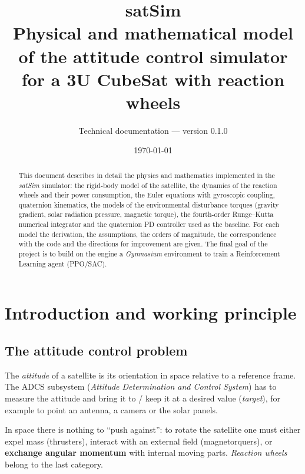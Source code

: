 \documentclass[11pt,a4paper]{article}
\title{\textbf{satSim}\\[0.3em]
\large Physical and mathematical model of the attitude control simulator\\
for a 3U CubeSat with reaction wheels}
\author{Technical documentation --- version 0.1.0}
\date{\today}
\begin{document}
\maketitle

\begin{abstract}
This document describes in detail the physics and mathematics implemented
in the \emph{satSim} simulator: the rigid-body model of the satellite, the
dynamics of the reaction wheels and their power consumption, the Euler
equations with gyroscopic coupling, quaternion kinematics, the models of the
environmental disturbance torques (gravity gradient, solar radiation
pressure, magnetic torque), the fourth-order Runge--Kutta numerical
integrator and the quaternion PD controller used as the baseline.
For each model the derivation, the assumptions, the orders of magnitude,
the correspondence with the code and the directions for improvement are given.
The final goal of the project is to build on the engine a \emph{Gymnasium}
environment to train a Reinforcement Learning agent (PPO/SAC).
\end{abstract}

\tableofcontents
\newpage

\section{Introduction and working principle}

\subsection{The attitude control problem}
The \emph{attitude} of a satellite is its orientation in space relative to
a reference frame. The ADCS subsystem (\emph{Attitude Determination
and Control System}) has to measure the attitude and bring it to / keep it at a
desired value (\emph{target}), for example to point an antenna, a camera or the
solar panels.

In space there is nothing to ``push against'': to rotate the satellite one
must either expel mass (thrusters), interact with an external field
(magnetorquers), or \textbf{exchange angular momentum} with internal moving
parts. \emph{Reaction wheels} belong to the last category.
\end{document}
